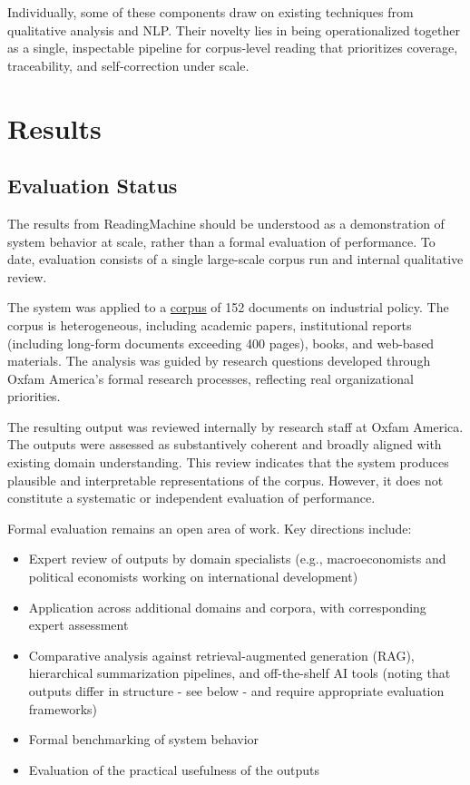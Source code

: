 \documentclass[
  11pt,
]{article}
\providecommand{\tightlist}{%
  \setlength{\itemsep}{0pt}\setlength{\parskip}{0pt}}
\begin{document}
Individually, some of these components draw on existing techniques from
qualitative analysis and NLP. Their novelty lies in being
operationalized together as a single, inspectable pipeline for
corpus‑level reading that prioritizes coverage, traceability, and
self‑correction under scale.

\section{Results}\label{results}

\subsection{Evaluation Status}\label{evaluation-status}

The results from ReadingMachine should be understood as a demonstration
of system behavior at scale, rather than a formal evaluation of
performance. To date, evaluation consists of a single large-scale corpus
run and internal qualitative review.

The system was applied to a
\href{https://github.com/morrisseyj/ReadingMachine/blob/main/evaluation/industrial_policy_main_run/corpus.md}{corpus}
of 152 documents on industrial policy. The corpus is heterogeneous,
including academic papers, institutional reports (including long-form
documents exceeding 400 pages), books, and web-based materials. The
analysis was guided by research questions developed through Oxfam
America's formal research processes, reflecting real organizational
priorities.

The resulting output was reviewed internally by research staff at Oxfam
America. The outputs were assessed as substantively coherent and broadly
aligned with existing domain understanding. This review indicates that
the system produces plausible and interpretable representations of the
corpus. However, it does not constitute a systematic or independent
evaluation of performance.

Formal evaluation remains an open area of work. Key directions include:

\begin{itemize}
\tightlist
\item
  Expert review of outputs by domain specialists (e.g., macroeconomists
  and political economists working on international development)
\item
  Application across additional domains and corpora, with corresponding
  expert assessment
\item
  Comparative analysis against retrieval-augmented generation (RAG),
  hierarchical summarization pipelines, and off-the-shelf AI tools
  (noting that outputs differ in structure - see below - and require
  appropriate evaluation frameworks)
\item
  Formal benchmarking of system behavior
\item
  Evaluation of the practical usefulness of the outputs
\end{itemize}
\end{document}
